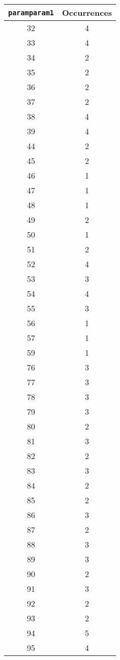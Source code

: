 \documentclass[letterpaper, 12pt]{article}
\begin{document}
\begin{longtable}{|c|c|}
\hline
\textbf{\texttt{paramparam1}} & \textbf{Occurrences} \\
\hline
32 & 4 \\
\hline
33 & 4 \\
\hline
34 & 2 \\
\hline
35 & 2 \\
\hline
36 & 2 \\
\hline
37 & 2 \\
\hline
38 & 4 \\
\hline
39 & 4 \\
\hline
44 & 2 \\
\hline
45 & 2 \\
\hline
46 & 1 \\
\hline
47 & 1 \\
\hline
48 & 1 \\
\hline
49 & 2 \\
\hline
50 & 1 \\
\hline
51 & 2 \\
\hline
52 & 4 \\
\hline
53 & 3 \\
\hline
54 & 4 \\
\hline
55 & 3 \\
\hline
56 & 1 \\
\hline
57 & 1 \\
\hline
59 & 1 \\
\hline
76 & 3 \\
\hline
77 & 3 \\
\hline
78 & 3 \\
\hline
79 & 3 \\
\hline
80 & 2 \\
\hline
81 & 3 \\
\hline
82 & 2 \\
\hline
83 & 3 \\
\hline
84 & 2 \\
\hline
85 & 2 \\
\hline
86 & 3 \\
\hline
87 & 2 \\
\hline
88 & 3 \\
\hline
89 & 3 \\
\hline
90 & 2 \\
\hline
91 & 3 \\
\hline
92 & 2 \\
\hline
93 & 2 \\
\hline
94 & 5 \\
\hline
95 & 4 \\

\end{longtable}
\end{document}

